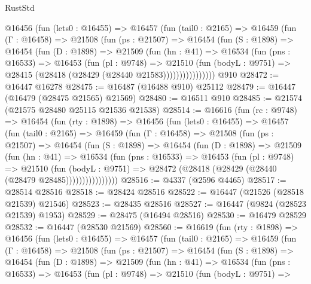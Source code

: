 \begin{lexlean}{RustStd}
\begin{coremodule}
        @16456
          (fun (lets0 : @16455) =>
          @16457
            (fun (tail0 : @2165) =>
            @16459
              (fun (Γ : @16458) =>
              @21508
                (fun (ps : @21507) =>
                @16454
                  (fun (S : @1898) =>
                  @16454
                    (fun (D : @1898) =>
                    @21509
                      (fun (hn : @41) =>
                      @16534
                        (fun (pns : @16533) =>
                        @16453
                          (fun (pl : @9748) =>
                          @21510
                            (fun (bodyL : @9751) =>
                            @28415 (@28418 (@28429 (@28440 @21583))))))))))))))))
    @910
@28472 := @16447 @16278
@28475 := @16487 (@16488 @910) @25112
@28479 := @16447 (@16479 (@28475 @21565) @21569)
@28480 := @16511 @910
@28485 := @21574 (@21575 @28480 @25115 @21536 @21538)
@28514 := @16616
    (fun (rc : @9748) =>
    @16454
      (fun (rty : @1898) =>
      @16456
        (fun (lets0 : @16455) =>
        @16457
          (fun (tail0 : @2165) =>
          @16459
            (fun (Γ : @16458) =>
            @21508
              (fun (ps : @21507) =>
              @16454
                (fun (S : @1898) =>
                @16454
                  (fun (D : @1898) =>
                  @21509
                    (fun (hn : @41) =>
                    @16534
                      (fun (pns : @16533) =>
                      @16453
                        (fun (pl : @9748) =>
                        @21510
                          (fun (bodyL : @9751) =>
                          @28472 (@28418 (@28429 (@28440 (@28479 @28485))))))))))))))))
@28516 := @4337 (@2596 @4465)
@28517 := @28514 @28516
@28518 := @28424 @28516
@28522 := @16447 (@21526 (@28518 @21539) @21546)
@28523 := @28435 @28516
@28527 := @16447 (@9824 (@28523 @21539) @1953)
@28529 := @28475 (@16494 @28516)
@28530 := @16479 @28529
@28532 := @16447 (@28530 @21569)
@28560 := @16619
    (fun (rty : @1898) =>
    @16456
      (fun (lets0 : @16455) =>
      @16457
        (fun (tail0 : @2165) =>
        @16459
          (fun (Γ : @16458) =>
          @21508
            (fun (ps : @21507) =>
            @16454
              (fun (S : @1898) =>
              @16454
                (fun (D : @1898) =>
                @21509
                  (fun (hn : @41) =>
                  @16534
                    (fun (pns : @16533) =>
                    @16453
                      (fun (pl : @9748) =>
                      @21510
                        (fun (bodyL : @9751) =>

\end{coremodule}
\end{lexlean}
